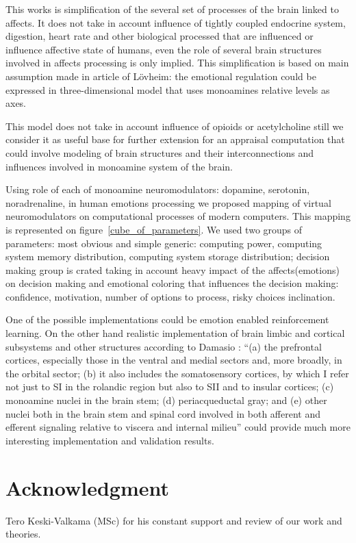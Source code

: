 This works is simplification of the several set of processes of the brain linked to affects. It does not take in account influence of tightly coupled endocrine system, digestion, heart rate and other biological processed that are influenced or influence affective state of humans, even the role of several brain structures involved in affects processing is only implied. This simplification is based on main assumption made in article of L\"{o}vheim: the emotional regulation could be expressed in three-dimensional model that uses monoamines relative levels as axes. 

This model does not take in account influence of opioids \cite{emotionsbraintorobot} or acetylcholine \cite{roleOfReinforcement} still we consider it as useful base for further extension for an appraisal computation that could involve modeling of brain structures and their interconnections and influences involved in monoamine system of the brain.   

Using role of each of monoamine neuromodulators: dopamine, serotonin, noradrenaline, in human emotions processing we proposed mapping of virtual neuromodulators on computational processes of modern computers. This mapping is represented on figure~\ref{cube_of_parameters}. We used two groups of parameters: most obvious and simple generic: computing power, computing system memory distribution, computing system storage distribution; decision making group is crated taking in account heavy impact of the affects(emotions) on decision making and emotional coloring that influences the decision making: confidence, motivation, number of options to process, risky choices inclination.

One of the possible implementations could be emotion enabled reinforcement learning. On the other hand realistic implementation of brain limbic and cortical subsystems and other structures according to Damasio \cite{emotionInPerspectiveOfIntegratedNervousSystem}: ``(a) the prefrontal cortices, especially those in the ventral and medial sectors and, more broadly, in the orbital sector; (b) it also includes the somatosensory cortices, by which I refer not just to SI in the rolandic region but also to SII and to insular cortices; (c) monoamine nuclei in the brain stem; (d) periacqueductal gray; and (e) other nuclei both in the brain stem and spinal cord involved in both afferent and efferent signaling relative to viscera and internal milieu'' could provide much more interesting implementation and validation results. 

\section{Acknowledgment}

Tero Keski-Valkama (MSc) for his constant support and review of our work and theories.
